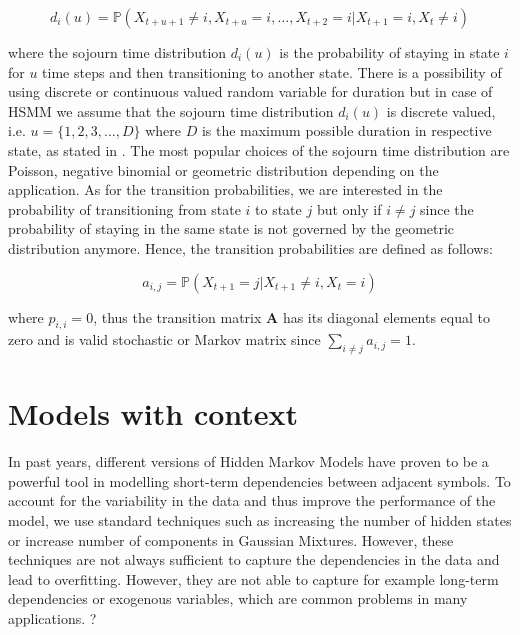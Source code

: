 \begin{equation}
    d_{i}(u) = \mathbb{P}(X_{t+u+1} \neq i,X_{t+u} = i,\ldots,X_{t+2} = i|X_{t+1} = i, X_t \neq i)
\end{equation}

where the sojourn time distribution $d_{i}(u)$ is the probability of staying in state $i$ for $u$ time steps and then transitioning to another state. There is a possibility of using discrete or continuous valued random variable for duration
but in case of HSMM we assume that the sojourn time distribution $d_i(u)$ is discrete valued, i.e. $u = \{1,2,3,\ldots,D\}$ where $D$ is the maximum possible duration in respective state, as stated in \citep{Yu2010}. The most popular choices 
of the sojourn time distribution are Poisson, negative binomial or geometric distribution
depending on the application. As for the transition probabilities, we are interested in the probability of transitioning from state $i$ to state $j$ but only if $i \neq j$ since the probability of 
staying in the same state is not governed by the geometric distribution anymore. \citep{Abdullah2022} Hence, the transition probabilities are defined as follows:

\begin{equation}
    a_{i,j} = \mathbb{P}(X_{t+1} = j|X_{t+1} \neq i, X_t = i)
\end{equation}

where $p_{i,i} = 0$, thus the transition matrix $\textbf{A}$ has its diagonal elements equal to zero and is valid stochastic or Markov matrix since $\sum_{i \neq j} a_{i,j}= 1$.

\section{Models with context}

In past years, different versions of Hidden Markov Models have proven to be a powerful tool in modelling short-term dependencies between adjacent symbols.
To account for the variability in the data and thus improve the performance of the model, we use standard techniques such as increasing the number of hidden states or 
increase number of components in Gaussian Mixtures. However, these techniques are not always sufficient to capture the dependencies in the data and lead to overfitting. \citep{Yoon2006}
However, they are not able to capture for example long-term dependencies or exogenous variables, which are common problems in many applications. \citep{Yoon2006}?

